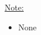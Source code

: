\noindent\uline{Note:}
\begin{itemize}
\item[~] None
\end{itemize}

\begin{figure}[htb]
\begin{center}
\end{center}
\end{figure}
